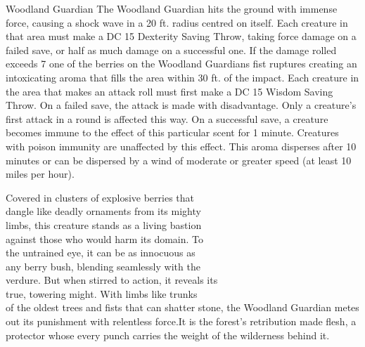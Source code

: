 \begin{DndMonster}[width=0.5\textwidth]{Woodland Guardian}
	The Woodland Guardian hits the ground with immense force, causing a shock wave in a 20 ft. radius centred on itself. Each creature in that area must make a DC 15 Dexterity Saving Throw, taking  force damage on a failed save, or half as much damage on a successful one. If the damage rolled exceeds 7 one of the berries on the Woodland Guardians fist ruptures creating an intoxicating aroma that fills the area within 30 ft. of the impact. Each creature in the area that makes an attack roll must first make a DC 15 Wisdom Saving Throw. On a failed save, the attack is made with disadvantage. Only a creature's first attack in a round is affected this way. On a successful save, a creature becomes immune to the effect of this particular scent for 1 minute. Creatures with poison immunity are unaffected by this effect. This aroma disperses after 10 minutes or can be dispersed by a wind of moderate or greater speed  (at least 10 miles per hour).
\end{DndMonster}

\noindent Covered in clusters of explosive berries that\\dangle like deadly ornaments from its mighty\\limbs, this creature stands as a living bastion\\against those who would harm its domain. To\\the untrained eye, it can be as innocuous as\\any berry bush, blending seamlessly with the\\verdure. But when stirred to action, it reveals its\\true, towering might. With limbs like trunks\\of the oldest trees and fists that can shatter stone, the Woodland Guardian metes out its punishment with relentless force.It is the forest's retribution made flesh, a protector whose every punch carries the weight of the wilderness behind it.

